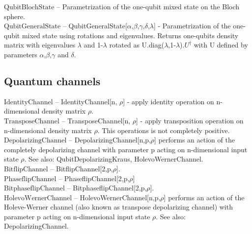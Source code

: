 \noindent\textbf{$ \text{QubitBlochState} $ }-- Parametrization of the one-qubit mixed state on the Bloch sphere.$  $\\

\noindent\textbf{$ \text{QubitGeneralState} $ }-- QubitGeneralState[$\alpha $,$\beta $,$\gamma $,$\delta $,$\lambda $] - Parametrization of the one-qubit mixed state using rotations and eigenvalues. Returns one-qubits density matrix with eigenvalues $\lambda $ and 1-$\lambda $ rotated as U.diag($\lambda $,1-$\lambda $).$ U^{\dagger } $ with U defined by parameters $\alpha $,$\beta $,$\gamma $ and $\delta $.$  $\\

\subsection{Quantum channels}

\noindent\textbf{$ \text{IdentityChannel} $ }-- IdentityChannel[n, $\rho $] - apply identity operation on n-dimensional density matrix $\rho $.$  $\\

\noindent\textbf{$ \text{TransposeChannel} $ }-- TransposeChannel[n, $\rho $] - apply transposition operation on n-dimensional density matrix $\rho $. This operations is not completely positive.$  $\\

\noindent\textbf{$ \text{DepolarizingChannel} $ }-- DepolarizingChannel[n,p,$\rho $] performs an action of the completely depolarizing channel with parameter p acting on n-dimensional input state $\rho $. See also: QubitDepolarizingKraus, HolevoWernerChannel.$  $\\

\noindent\textbf{$ \text{BitflipChannel} $ }-- BitflipChannel[2,p,$\rho $].$  $\\

\noindent\textbf{$ \text{PhaseflipChannel} $ }-- PhaseflipChannel[2,p,$\rho $]$  $\\

\noindent\textbf{$ \text{BitphaseflipChannel} $ }-- BitphaseflipChannel[2,p,$\rho $].$  $\\

\noindent\textbf{$ \text{HolevoWernerChannel} $ }-- HolevoWernerChannel[n,p,$\rho $] performs an action of the Holeve-Werner channel (also known as transpose depolarizing channel) with parameter p acting on n-dimensional input state $\rho $. See also: DepolarizingChannel.$  $\\


